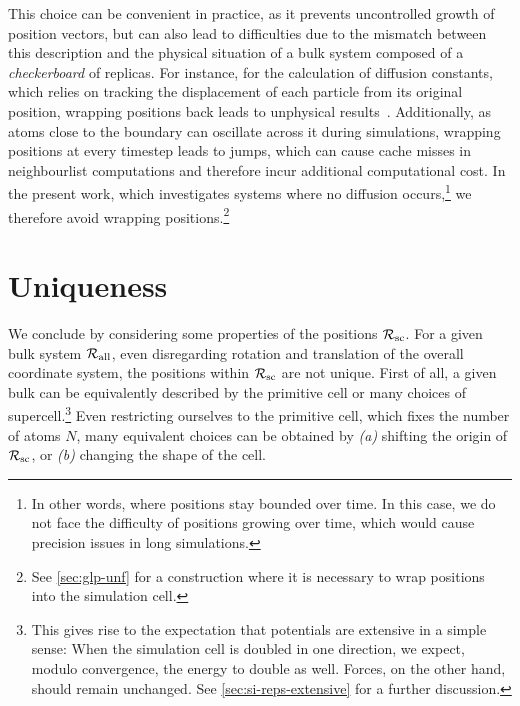 This choice can be convenient in practice, as it prevents uncontrolled growth of position vectors, but can also lead to difficulties due to the mismatch between this description and the physical situation of a bulk system composed of a \emph{checkerboard} of replicas. For instance, for the calculation of diffusion constants, which relies on tracking the displacement of each particle from its original position, wrapping positions back leads to unphysical results~\cite{a1993t,e1995t}. 
Additionally, as atoms close to the boundary can oscillate across it during simulations, wrapping positions at every timestep leads to jumps, which can cause cache misses in neighbourlist computations and therefore incur additional computational cost.
In the present work, which investigates systems where no diffusion occurs,\footnote[][-5\baselineskip]{In other words, where positions stay bounded over time. In this case, we do not face the difficulty of positions growing over time, which would cause precision issues in long simulations.} we therefore avoid wrapping positions.\footnote[][-1\baselineskip]{See \cref{sec:glp-unf} for a construction where it is necessary to wrap positions into the simulation cell.} 

\clearpage
\section{Uniqueness}


We conclude by considering some properties of the positions $\mathcal{R_{\text{sc}}}$.
For a given bulk system $\mathcal{R_{\text{all}}}$, even disregarding rotation and translation of the overall coordinate system, the positions within $\mathcal{R_{\text{sc}}}$ are not unique.
First of all, a given bulk can be equivalently described by the primitive cell or many choices of supercell.\footnote{This gives rise to the expectation that potentials are extensive in a simple sense: When the simulation cell is doubled in one direction, we expect, modulo convergence, the energy to double as well. Forces, on the other hand, should remain unchanged. See \cref{sec:si-reps-extensive} for a further discussion.}
Even restricting ourselves to the primitive cell, which fixes the number of atoms $N$, many equivalent choices can be obtained by \emph{(a)} shifting the origin of $\mathcal{R_{\text{sc}}}$, or \emph{(b)} changing the shape of the cell.

